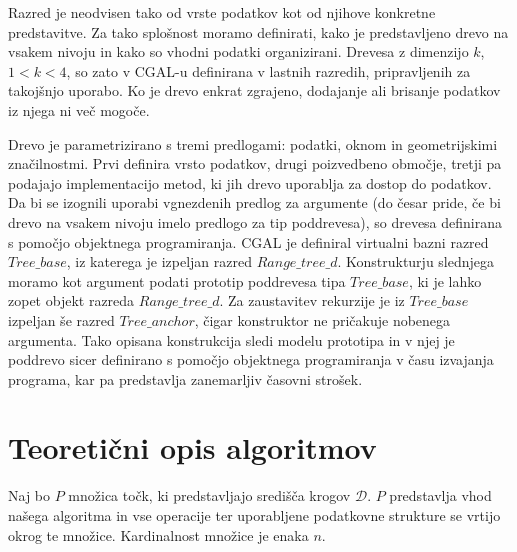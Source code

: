 \documentclass[a4paper, 12pt]{book}
\newcommand{\D}{\ensuremath{\mathcal{D}}}
\newcommand{\U}{\texttt{\_}}
\begin{document}
Razred je neodvisen tako od vrste podatkov kot od njihove konkretne predstavitve. Za tako splošnost moramo definirati, kako je predstavljeno drevo na vsakem nivoju in kako so vhodni podatki organizirani. Drevesa z dimenzijo $k$, $ 1 < k < 4$, so zato v CGAL-u definirana v lastnih razredih, pripravljenih za takojšnjo uporabo. Ko je drevo enkrat zgrajeno, dodajanje ali brisanje podatkov iz njega ni več mogoče.

\bigbreak
Drevo je parametrizirano s tremi predlogami: podatki, oknom in geometrijskimi značilnostmi. Prvi definira vrsto podatkov, drugi poizvedbeno območje, tretji pa podajajo implementacijo metod, ki jih drevo uporablja za dostop do podatkov. Da bi se izognili uporabi vgnezdenih predlog za argumente (do česar pride, če bi drevo na vsakem nivoju imelo predlogo za tip poddrevesa), so drevesa definirana s pomočjo objektnega programiranja. CGAL je definiral virtualni bazni razred $Tree\U base$, iz katerega je izpeljan razred $Range\U tree\U d$. Konstrukturju slednjega moramo kot argument podati prototip poddrevesa tipa $Tree\U base$, ki je lahko zopet objekt razreda $Range\U tree\U d$. Za zaustavitev rekurzije je iz $Tree\U base$ izpeljan še razred $Tree\U anchor$, čigar konstruktor ne pričakuje nobenega argumenta. Tako opisana konstrukcija sledi modelu prototipa in v njej je poddrevo sicer definirano s pomočjo objektnega programiranja v času izvajanja programa, kar pa predstavlja zanemarljiv časovni strošek.

\chapter{Teoretični opis algoritmov}
Naj bo $P$ množica točk, ki predstavljajo središča krogov $\D$. $P$ predstavlja vhod našega algoritma in vse operacije ter uporabljene podatkovne strukture se vrtijo okrog te množice. Kardinalnost množice je enaka $n$.
\end{document}
